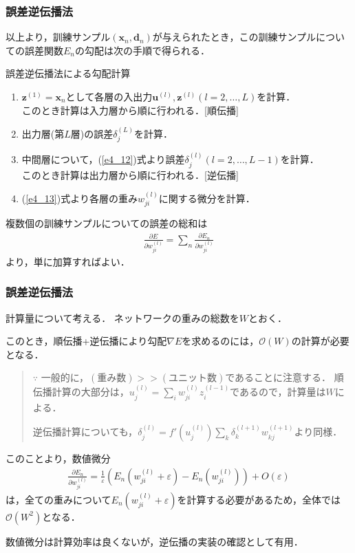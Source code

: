 \documentclass[dvipdfmx]{beamer}
\newcommand{\fp}[2]{\frac{\partial #1}{\partial #2}}
\renewcommand{\d}[2]{\delta_{#1}^{(#2)}}
\renewcommand{\u}[2]{u_{#1}^{(#2)}}
\newcommand{\w}[2]{w_{#1}^{(#2)}}
\newcommand{\z}[2]{z_{#1}^{(#2)}}
\begin{document}
\begin{frame}
    \frametitle{誤差逆伝播法}
    以上より，訓練サンプル$(\bm{x}_n, \bm{d}_n)$が与えられたとき，この訓練サンプルについての誤差関数$E_n$の勾配は次の手順で得られる．
    \begin{block}{誤差逆伝播法による勾配計算}
        \begin{enumerate}
            \item $\bm{z}^{(1)} = \bm{x}_n$として各層の入出力$\bm{u}^{(l)}, \bm{z}^{(l)} (l = 2,\ldots, L)$を計算．\\
            このとき計算は入力層から順に行われる．[順伝播]
            \item 出力層(第$L$層)の誤差$\d{j}{L}$を計算．
            \item 中間層について，(\ref{e4_12})式より誤差$\d{j}{l} (l = 2, \ldots , L-1)$を計算．\\
            このとき計算は出力層から順に行われる．[逆伝播]
            \item (\ref{e4_13})式より各層の重み$\w{ji}{l}$に関する微分を計算．
        \end{enumerate}
    \end{block}

    複数個の訓練サンプルについての誤差の総和は
    \begin{align*}
        \fp{E}{\w{ji}{l}} = \sum_{n} \fp{E_n}{\w{ji}{l}}
    \end{align*}
    より，単に加算すればよい．
\end{frame}


\begin{frame}
    \frametitle{誤差逆伝播法}
    計算量について考える．
    ネットワークの重みの総数を$W$とおく．

    このとき，順伝播+逆伝播により勾配$\nabla E$を求めるのには，$\mathcal{O}(W)$の計算が必要となる．
    \begin{quote}
    $\because$ 一般的に，$(\text{重み数}) >> (\text{ユニット数})$であることに注意する．
    順伝播計算の大部分は，$\u{j}{l} = \sum_{i} \w{ji}{l} \z{i}{l-1}$であるので，計算量は$W$による．

    逆伝播計算についても，$\d{j}{l} = f'(\u{j}{l}) \sum_{k} \d{k}{l+1} \w{kj}{l+1}$より同様．
    \end{quote}
    このことより，数値微分
    \begin{align*}
        \fp{E_n}{\w{ji}{l}} = \frac{1}{\varepsilon} (E_n(\w{ji}{l} + \varepsilon) - E_n(\w{ji}{l})) + O(\varepsilon)
    \end{align*}
    は，全ての重みについて$E_n(\w{ji}{l} + \varepsilon)$を計算する必要があるため，全体では$\mathcal{O}(W^2)$となる．

    数値微分は計算効率は良くないが，逆伝播の実装の確認として有用．
\end{frame}
\end{document}
